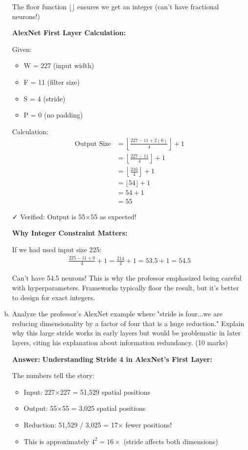 \documentclass[12pt]{article}
\newcommand{\answer}[1]{{\color{answercolor}\textbf{Answer:} #1}}
\newcommand{\explanation}[1]{{\color{explanationcolor}#1}}
\begin{document}
\begin{enumerate}[(a)]
{    The floor function $\lfloor \rfloor$ ensures we get an integer (can't have fractional neurons!)
    
    \textbf{AlexNet First Layer Calculation:}
    
    \explanation{
    Given:
    \begin{itemize}
        \item W = 227 (input width)
        \item F = 11 (filter size)
        \item S = 4 (stride)
        \item P = 0 (no padding)
    \end{itemize}
    
    Calculation:
    \begin{align}
    \text{Output Size} &= \left\lfloor\frac{227 - 11 + 2(0)}{4}\right\rfloor + 1\\
    &= \left\lfloor\frac{227 - 11}{4}\right\rfloor + 1\\
    &= \left\lfloor\frac{216}{4}\right\rfloor + 1\\
    &= \lfloor 54 \rfloor + 1\\
    &= 54 + 1\\
    &= 55
    \end{align}
    
    ✓ Verified: Output is 55×55 as expected!
    }
    
    \textbf{Why Integer Constraint Matters:}
    
    \explanation{
    If we had used input size 225:
    \begin{align}
    \frac{225 - 11 + 0}{4} + 1 = \frac{214}{4} + 1 = 53.5 + 1 = 54.5
    \end{align}
    
    Can't have 54.5 neurons! This is why the professor emphasized being careful with hyperparameters. Frameworks typically floor the result, but it's better to design for exact integers.
    }
    }
    
    \item Analyze the professor's AlexNet example where "stride is four...we are reducing dimensionality by a factor of four that is a huge reduction." Explain why this large stride works in early layers but would be problematic in later layers, citing his explanation about information redundancy. \hfill (10 marks)
    
    \answer{
    \textbf{Understanding Stride 4 in AlexNet's First Layer:}
    
    \explanation{
    The numbers tell the story:
    \begin{itemize}
        \item Input: 227×227 = 51,529 spatial positions
        \item Output: 55×55 = 3,025 spatial positions
        \item Reduction: 51,529 / 3,025 = 17× fewer positions!
        \item This is approximately $4^2 = 16×$ (stride affects both dimensions)
    \end{itemize}
    }
    
}
\end{enumerate}
\end{document}
